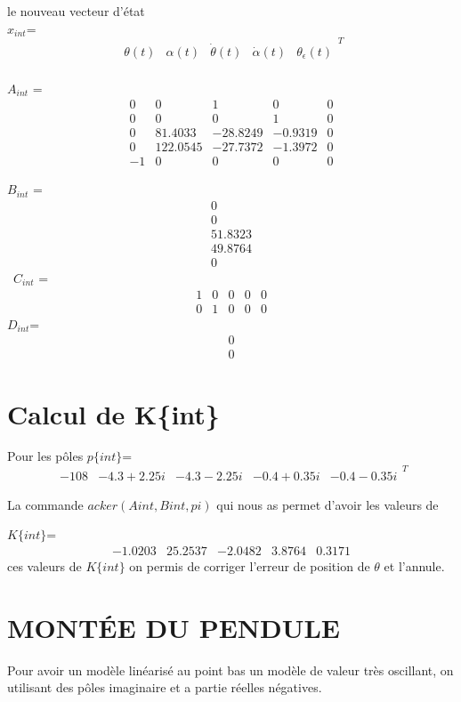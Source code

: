 \documentclass[12pt, a4paper, openany]{report}
\begin{document}
le nouveau vecteur d'état\\

 
 $x_{int}$=
$$ 
 \begin{matrix}
\theta(t) & \alpha(t)& \dot{\theta}(t) & \dot{\alpha}(t)&\theta_{\epsilon}(t) 
\end{matrix}^{T}
 $$
\\

$A_{int}$ =
$$
\begin{matrix}
 0&0&1&0&0\\
 0&0&0&1&0\\
 0&81.4033&-28.8249&-0.9319&0\\
 0&122.0545&-27.7372&-1.3972&0\\
 -1&0&0&0&0
\end{matrix}
$$

$B_{int}$ =
$$
\begin{matrix}
        0\\
         0\\
   51.8323\\
   49.8764\\
         0
\end{matrix}
$$
\quad\quad\quad\
$C_{int}$ =
$$
\begin{matrix}
     1&0&0&0&0\\
     0&1&0&0&0
\end{matrix}
$$
\quad\quad
$D_{int}$=
$$
\begin{matrix}
0\\
0
\end{matrix}
$$

    \section{Calcul de K\{int\}}
    
    Pour les pôles $p\{int\}$=
    $$\begin{matrix}
-108&-4.3+2.25i&-4.3-2.25i&-0.4+0.35i&-0.4-0.35i
\end{matrix}^{T}$$

  La commande $acker(Aint,Bint,pi)$ qui nous as permet d'avoir les valeurs de 
 
 $K\{int\}$=
 $$\begin{matrix}
-1.0203  & 25.2537 &  -2.0482  &  3.8764  &  0.3171
\end{matrix}$$
ces valeurs de $K\{int\}$ on permis de corriger l'erreur de position de $\theta$ et l'annule. 


\section{MONTÉE DU PENDULE}
      Pour avoir un modèle linéarisé au point bas un modèle de valeur très oscillant, on utilisant des pôles imaginaire et a partie réelles négatives.   
      
\end{document}
